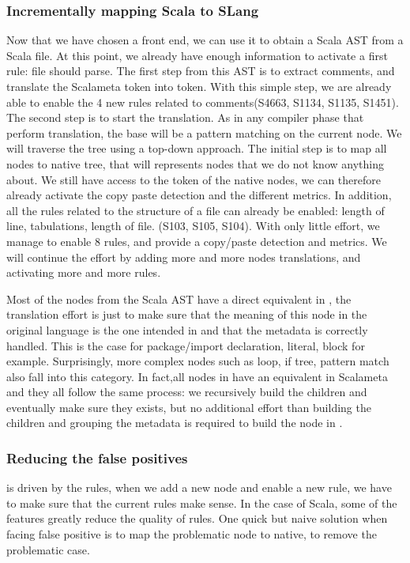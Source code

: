 \subsubsection{Incrementally mapping Scala to SLang}
\label{subsubsec:scala_to_slang}
Now that we have chosen a front end, we can use it to obtain a Scala AST from a Scala file. At this point, we already have enough information to activate a first rule: file should parse.
The first step from this AST is to extract comments, and translate the Scalameta token into \slang token.
With this simple step, we are already able to enable the 4 new rules related to comments(S4663, S1134, S1135, S1451).
The second step is to start the translation. As in any compiler phase that perform translation, the base will be a pattern matching on the current node. 
We will traverse the tree using a top-down approach. 
The initial step is to map all nodes to native tree, that will represents nodes that we do not know anything about. 
We still have access to the token of the native nodes, we can therefore already activate the copy paste detection and the different metrics. 
In addition, all the rules related to the structure of a file can already be enabled: length of line, tabulations, length of file. (S103, S105, S104).
With only little effort, we manage to enable 8 rules, and provide a copy/paste detection and metrics. 
We will continue the effort by adding more and more nodes translations, and activating more and more rules.

Most of the nodes from the Scala AST have a direct equivalent in \slang, the translation effort is just to make sure that the meaning of this node in the original language is the one intended in \slang and that the metadata is correctly handled. This is the case for package/import declaration, literal, block for example. Surprisingly, more complex nodes such as loop, if tree, pattern match also fall into this category.
In fact,all nodes in \slang have an equivalent in Scalameta and they all follow the same process: we recursively build the children and eventually make sure they exists, but no additional effort than building the children and grouping the metadata is required to build the node in \slang.

\subsubsection{Reducing the false positives}
\label{subsubsec:reducing_false_positives}

\slang is driven by the rules, when we add a new node and enable a new rule, we have to make sure that the current rules make sense. 
In the case of Scala, some of the features greatly reduce the quality of rules.
One quick but naive solution when facing false positive is to map the problematic node to native, to remove the problematic case.

